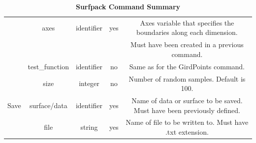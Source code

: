 \documentclass{article}
\begin{document}
\begin{table}
\begin{tabular}{|c|c|c|c|c|}
    \hline
    & axes & identifier & yes & Axes variable that specifies the
    boundaries along each dimension.\\
    & & & & Must have been created in a previous command.\\
    \hline
    & test\_function & identifier & no & Same as for the
    GirdPoints command.\\
    \hline
    & size & integer & no & Number of random samples.  Default is
    100.\\
    \hline
    Save & surface/data & identifier & yes & Name of data or
    surface to be saved.  Must have been previously defined.\\
    \hline
    & file & string & yes & Name of file to be written to.  Must have .txt
    extension.\\
    \hline
  \end{tabular}
  \caption{\textbf{Surfpack Command Summary}}
\end{table}
\end{document}
